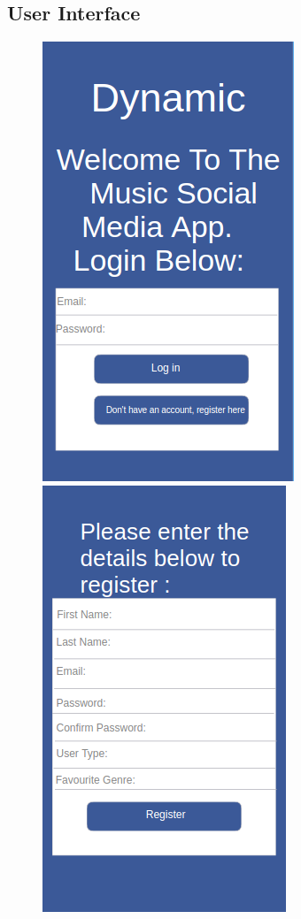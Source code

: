 \subsection{User Interface}
\begin{figure}[H]
\includegraphics[scale=0.5]{images/ui1}
\includegraphics[scale=0.5]{images/ui2}

\end{figure}
